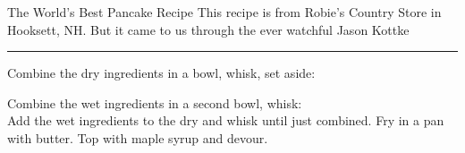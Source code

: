 \begin{recipe}{The World's Best Pancake Recipe}{}{}
\freeform This recipe is from Robie's Country Store in Hooksett, NH. But it came to us through the ever watchful Jason Kottke\\
\rule{\textwidth}{0.05pt}

Combine the dry ingredients in a bowl, whisk, set aside:

Combine the wet ingredients in a second bowl, whisk:
\newline
\\
Add the wet ingredients to the dry and whisk until just combined. Fry in a pan with butter. Top with maple syrup and devour.
\end{recipe}
